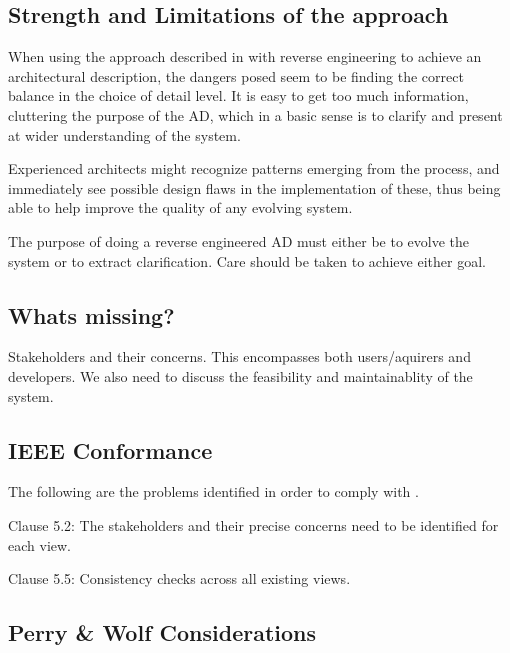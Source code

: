 \documentclass[a4paper,10pt]{article}
\begin{document}
\subsection{Strength and Limitations of the approach}

When using the approach described in \cite{christensen2004archdesc} with reverse 
engineering to achieve an architectural description, the dangers posed seem to 
be finding the correct balance in the choice of detail level. It
is easy to get too much information, cluttering the purpose of the 
AD, which in a basic sense is to clarify and present at wider understanding of
the system.

Experienced architects might recognize patterns emerging from the process, and 
immediately see possible design flaws in the implementation of these, thus
being able to help improve the quality of any evolving system.

The purpose of doing a reverse engineered AD must either be to evolve
the system or to extract clarification. Care should be taken to achieve either
goal. 
\subsection{Whats missing?}
Stakeholders and their concerns. This encompasses both users/aquirers and developers. We also need to discuss the feasibility and maintainablity of the system. 

\subsection{IEEE Conformance}


The following are the problems identified in order to comply with \cite{ieeerecommendedpractice}.

Clause 5.2: The stakeholders and their precise concerns need to be identified for each view. 

Clause 5.5: Consistency checks across all existing views.

\subsection{Perry \& Wolf Considerations}
\end{document}
